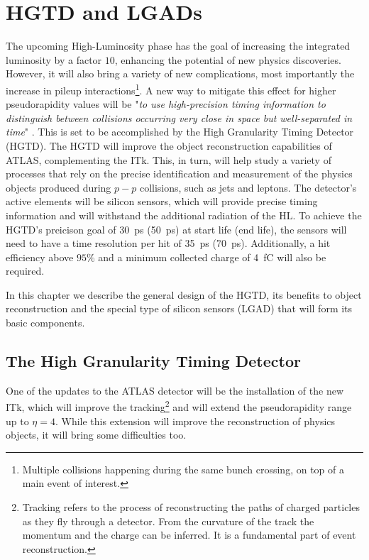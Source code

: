 \chapter{HGTD and LGADs}\label{chap:HGTD_LGADs}

The upcoming High-Luminosity phase has the goal of increasing the integrated luminosity by a factor \(10\), enhancing the potential of new physics discoveries. However, it will also bring a variety of new complications, most importantly the increase in pileup interactions\footnote{Multiple collisions happening during the same bunch crossing, on top of a main event of interest.}.
A new way to mitigate this effect for higher pseudorapidity values will be "\textit{to use high-precision timing information to distinguish between collisions occurring very close in space but well-separated in time}" \cite{CERN-LHCC-2020-007}. This is set to be accomplished by the High Granularity Timing Detector (HGTD).
The HGTD will improve the object reconstruction capabilities of ATLAS, complementing the ITk. This, in turn, will help study a variety of processes that rely on the precise identification and measurement of the physics objects produced during \(p-p\) collisions, such as jets and leptons.
The detector's active elements will be silicon sensors, which will provide precise timing information and will withstand the additional radiation of the HL. To achieve the HGTD's preicison goal of \qty{30}{\pico\second} (\qty{50}{\pico\second}) at start life (end life), the sensors will need to have a time resolution per hit of \qty{35}{\pico\second} (\qty{70}{\pico\second}). Additionally, a hit efficiency above \(95\%\) and %
a minimum collected charge of \qty{4}{\femto\coulomb} will also be required.

In this chapter we describe the general design of the HGTD, its benefits to object reconstruction and the special type of silicon sensors (LGAD) that will form its basic components.

\section{The High Granularity Timing Detector}\label{sec:HGTD}
One of the updates to the ATLAS detector will be the installation of the new ITk, which will improve the tracking\footnote{Tracking refers to the process of reconstructing the paths of charged particles as they fly through a detector. From the curvature of the track the momentum and the charge can be inferred. It is a fundamental part of event reconstruction.} and will extend the pseudorapidity range up to \(\eta=4\). While this extension will improve the reconstruction of physics objects, it will bring some difficulties too.

